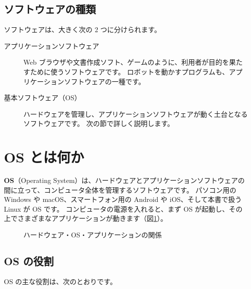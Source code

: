 \subsection{ソフトウェアの種類}

ソフトウェアは、大きく次の 2 つに分けられます。

\begin{description}
  \item[アプリケーションソフトウェア]
    Web ブラウザや文書作成ソフト、ゲームのように、利用者が目的を果たすために使うソフトウェアです。
    ロボットを動かすプログラムも、アプリケーションソフトウェアの一種です。
  \item[基本ソフトウェア（OS）]
    ハードウェアを管理し、アプリケーションソフトウェアが動く土台となるソフトウェアです。
    次の節で詳しく説明します。
\end{description}

\section{OS とは何か}
\label{sec:computer-os}

\textbf{OS}（Operating System）は、ハードウェアとアプリケーションソフトウェアの間に立って、コンピュータ全体を管理するソフトウェアです。
パソコン用の Windows や macOS、スマートフォン用の Android や iOS、そして本書で扱う Linux が OS です。
コンピュータの電源を入れると、まず OS が起動し、その上でさまざまなアプリケーションが動きます（図\ref{fig:computer-os-layer}）。

\begin{figure}[tb]
  \centering
  
  \caption{ハードウェア・OS・アプリケーションの関係}
  \label{fig:computer-os-layer}
\end{figure}

\subsection{OS の役割}

OS の主な役割は、次のとおりです。

